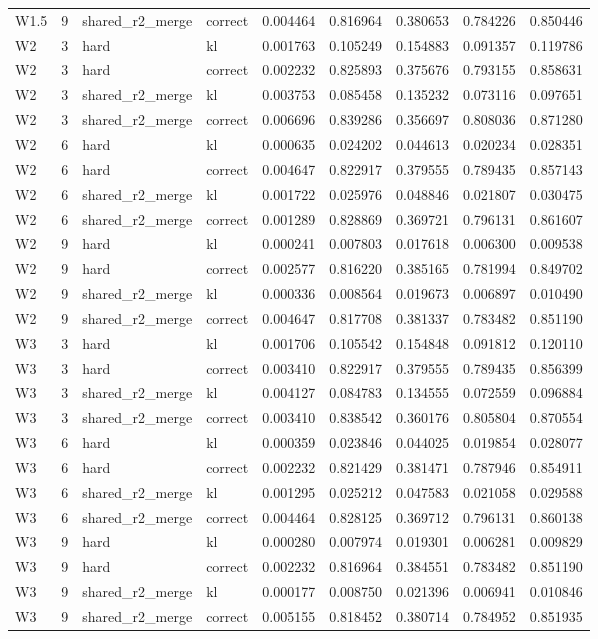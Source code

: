 \begin{tabular}{lrllrrrrr}
W1.5 & 9 & shared_r2_merge & correct & 0.004464 & 0.816964 & 0.380653 & 0.784226 & 0.850446 \\
W2 & 3 & hard & kl & 0.001763 & 0.105249 & 0.154883 & 0.091357 & 0.119786 \\
W2 & 3 & hard & correct & 0.002232 & 0.825893 & 0.375676 & 0.793155 & 0.858631 \\
W2 & 3 & shared_r2_merge & kl & 0.003753 & 0.085458 & 0.135232 & 0.073116 & 0.097651 \\
W2 & 3 & shared_r2_merge & correct & 0.006696 & 0.839286 & 0.356697 & 0.808036 & 0.871280 \\
W2 & 6 & hard & kl & 0.000635 & 0.024202 & 0.044613 & 0.020234 & 0.028351 \\
W2 & 6 & hard & correct & 0.004647 & 0.822917 & 0.379555 & 0.789435 & 0.857143 \\
W2 & 6 & shared_r2_merge & kl & 0.001722 & 0.025976 & 0.048846 & 0.021807 & 0.030475 \\
W2 & 6 & shared_r2_merge & correct & 0.001289 & 0.828869 & 0.369721 & 0.796131 & 0.861607 \\
W2 & 9 & hard & kl & 0.000241 & 0.007803 & 0.017618 & 0.006300 & 0.009538 \\
W2 & 9 & hard & correct & 0.002577 & 0.816220 & 0.385165 & 0.781994 & 0.849702 \\
W2 & 9 & shared_r2_merge & kl & 0.000336 & 0.008564 & 0.019673 & 0.006897 & 0.010490 \\
W2 & 9 & shared_r2_merge & correct & 0.004647 & 0.817708 & 0.381337 & 0.783482 & 0.851190 \\
W3 & 3 & hard & kl & 0.001706 & 0.105542 & 0.154848 & 0.091812 & 0.120110 \\
W3 & 3 & hard & correct & 0.003410 & 0.822917 & 0.379555 & 0.789435 & 0.856399 \\
W3 & 3 & shared_r2_merge & kl & 0.004127 & 0.084783 & 0.134555 & 0.072559 & 0.096884 \\
W3 & 3 & shared_r2_merge & correct & 0.003410 & 0.838542 & 0.360176 & 0.805804 & 0.870554 \\
W3 & 6 & hard & kl & 0.000359 & 0.023846 & 0.044025 & 0.019854 & 0.028077 \\
W3 & 6 & hard & correct & 0.002232 & 0.821429 & 0.381471 & 0.787946 & 0.854911 \\
W3 & 6 & shared_r2_merge & kl & 0.001295 & 0.025212 & 0.047583 & 0.021058 & 0.029588 \\
W3 & 6 & shared_r2_merge & correct & 0.004464 & 0.828125 & 0.369712 & 0.796131 & 0.860138 \\
W3 & 9 & hard & kl & 0.000280 & 0.007974 & 0.019301 & 0.006281 & 0.009829 \\
W3 & 9 & hard & correct & 0.002232 & 0.816964 & 0.384551 & 0.783482 & 0.851190 \\
W3 & 9 & shared_r2_merge & kl & 0.000177 & 0.008750 & 0.021396 & 0.006941 & 0.010846 \\
W3 & 9 & shared_r2_merge & correct & 0.005155 & 0.818452 & 0.380714 & 0.784952 & 0.851935 \\
\bottomrule
\end{tabular}
